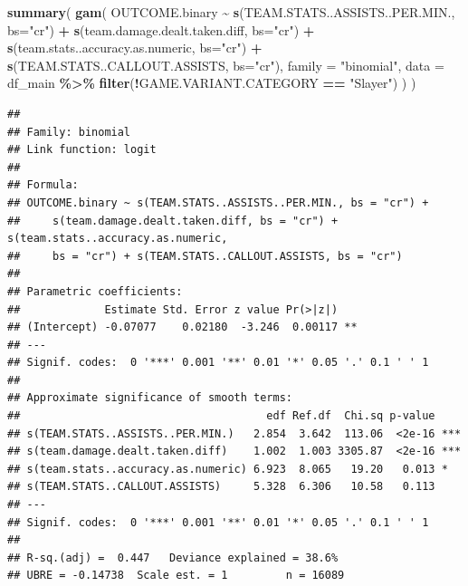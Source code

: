 \documentclass[
]{article}
\newenvironment{Shaded}{\begin{snugshade}}{\end{snugshade}}
\newcommand{\AttributeTok}[1]{\textcolor[rgb]{0.13,0.29,0.53}{#1}}
\newcommand{\FunctionTok}[1]{\textcolor[rgb]{0.13,0.29,0.53}{\textbf{#1}}}
\newcommand{\NormalTok}[1]{#1}
\newcommand{\SpecialCharTok}[1]{\textcolor[rgb]{0.81,0.36,0.00}{\textbf{#1}}}
\newcommand{\StringTok}[1]{\textcolor[rgb]{0.31,0.60,0.02}{#1}}
\begin{document}
\begin{Shaded}
\begin{Highlighting}[]
\FunctionTok{summary}\NormalTok{(}
  \FunctionTok{gam}\NormalTok{(}
\NormalTok{    OUTCOME.binary }\SpecialCharTok{\textasciitilde{}} \FunctionTok{s}\NormalTok{(TEAM.STATS..ASSISTS..PER.MIN., }\AttributeTok{bs=}\StringTok{"cr"}\NormalTok{) }\SpecialCharTok{+} \FunctionTok{s}\NormalTok{(team.damage.dealt.taken.diff, }\AttributeTok{bs=}\StringTok{"cr"}\NormalTok{) }\SpecialCharTok{+} \FunctionTok{s}\NormalTok{(team.stats..accuracy.as.numeric, }\AttributeTok{bs=}\StringTok{"cr"}\NormalTok{) }\SpecialCharTok{+} \FunctionTok{s}\NormalTok{(TEAM.STATS..CALLOUT.ASSISTS, }\AttributeTok{bs=}\StringTok{"cr"}\NormalTok{),}
  \AttributeTok{family =} \StringTok{"binomial"}\NormalTok{,}
  \AttributeTok{data =}\NormalTok{ df\_main }\SpecialCharTok{\%\textgreater{}\%} 
    \FunctionTok{filter}\NormalTok{(}\SpecialCharTok{!}\NormalTok{GAME.VARIANT.CATEGORY }\SpecialCharTok{==} \StringTok{"Slayer"}\NormalTok{)}
\NormalTok{)}
\NormalTok{)}
\end{Highlighting}
\end{Shaded}

\begin{verbatim}
## 
## Family: binomial 
## Link function: logit 
## 
## Formula:
## OUTCOME.binary ~ s(TEAM.STATS..ASSISTS..PER.MIN., bs = "cr") + 
##     s(team.damage.dealt.taken.diff, bs = "cr") + s(team.stats..accuracy.as.numeric, 
##     bs = "cr") + s(TEAM.STATS..CALLOUT.ASSISTS, bs = "cr")
## 
## Parametric coefficients:
##             Estimate Std. Error z value Pr(>|z|)   
## (Intercept) -0.07077    0.02180  -3.246  0.00117 **
## ---
## Signif. codes:  0 '***' 0.001 '**' 0.01 '*' 0.05 '.' 0.1 ' ' 1
## 
## Approximate significance of smooth terms:
##                                      edf Ref.df  Chi.sq p-value    
## s(TEAM.STATS..ASSISTS..PER.MIN.)   2.854  3.642  113.06  <2e-16 ***
## s(team.damage.dealt.taken.diff)    1.002  1.003 3305.87  <2e-16 ***
## s(team.stats..accuracy.as.numeric) 6.923  8.065   19.20   0.013 *  
## s(TEAM.STATS..CALLOUT.ASSISTS)     5.328  6.306   10.58   0.113    
## ---
## Signif. codes:  0 '***' 0.001 '**' 0.01 '*' 0.05 '.' 0.1 ' ' 1
## 
## R-sq.(adj) =  0.447   Deviance explained = 38.6%
## UBRE = -0.14738  Scale est. = 1         n = 16089
\end{verbatim}
\end{document}
